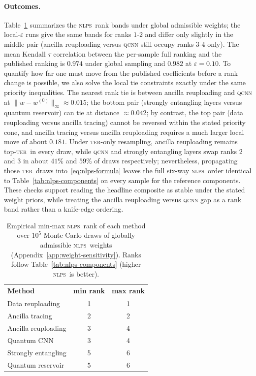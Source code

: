 \documentclass{article}
\newcommand{\ter}{\textsc{ter}}
\newcommand{\nlps}{\textsc{nlps}}
\begin{document}
\paragraph{Outcomes.}
Table~\ref{tab:weight-sensitivity-nlps} summarizes the \nlps\ rank bands under global admissible weights; the local-$\varepsilon$ runs give the same bands for ranks $1$-$2$ and differ only slightly in the middle pair (ancilla reuploading versus \textsc{qcnn} still occupy ranks $3$-$4$ only).
The mean Kendall $\tau$ correlation between the per-sample full ranking and the published ranking is $0.974$ under global sampling and $0.982$ at $\varepsilon = 0.10$.
To quantify how far one must move from the published coefficients before a rank change is possible, we also solve the local tie constraints exactly under the same priority inequalities.
The nearest rank tie is between ancilla reuploading and \textsc{qcnn} at $\|w-w^{(0)}\|_\infty \approx 0.015$; the bottom pair (strongly entangling layers versus quantum reservoir) can tie at distance $\approx 0.042$; by contrast, the top pair (data reuploading versus ancilla tracing) cannot be reversed within the stated priority cone, and ancilla tracing versus ancilla reuploading requires a much larger local move of about $0.181$.
Under \ter-only resampling, ancilla reuploading remains top-\ter\ in every draw, while \textsc{qcnn} and strongly entangling layers swap ranks $2$ and $3$ in about $41\%$ and $59\%$ of draws respectively; nevertheless, propagating those \ter\ draws into~\eqref{eq:nlps-formula} leaves the full six-way \nlps\ order identical to Table~\ref{tab:nlps-components} on every sample for the reference components.
These checks support reading the headline composite as stable under the stated weight priors, while treating the ancilla reuploading versus \textsc{qcnn} gap as a rank band rather than a knife-edge ordering.

\begin{table}[t]
  \caption{Empirical min-max \nlps\ rank of each method over $10^5$ Monte Carlo draws of globally admissible \nlps\ weights (Appendix~\ref{app:weight-sensitivity}). Ranks follow Table~\ref{tab:nlps-components} (higher \nlps\ is better).}
  \label{tab:weight-sensitivity-nlps}
  \centering
  \small
  \begin{tabular}{lcc}
    \toprule
    Method & min rank & max rank \\
    \midrule
    Data reuploading & 1 & 1 \\
    Ancilla tracing & 2 & 2 \\
    Ancilla reuploading & 3 & 4 \\
    Quantum CNN & 3 & 4 \\
    Strongly entangling & 5 & 6 \\
    Quantum reservoir & 5 & 6 \\
    \bottomrule
  \end{tabular}
\end{table}

\newpage

\end{document}
